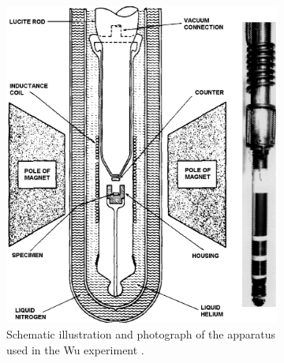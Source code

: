 \begin{figure}
    \centering
    \begin{subfigure}[b]{.39\linewidth}
        \includegraphics[width=\linewidth]{figs/setup.png}
        \caption{Schematic illustration and photograph of the apparatus used in the Wu experiment \cite{NIST}.}
        \label{fig:setup}
    \end{subfigure}
    \begin{subfigure}[b]{.39\linewidth}

\end{subfigure}
\end{figure}
